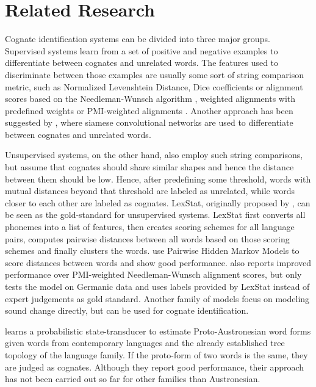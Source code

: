 \documentclass[6pt]{article}
\begin{document}
\section{Related Research}
\label{Related_Research}
Cognate identification systems can be divided into three major groups. Supervised systems learn from a set of positive and negative examples to differentiate between cognates and unrelated words. The features used to discriminate between those examples are usually some sort of  string comparison metric, such as Normalized Levenshtein Distance, Dice coefficients or  alignment scores based on the Needleman-Wunsch algorithm  \citep{bergsma2007alignment,inkpen2005automatic}, weighted alignments with predefined weights \citep{kondrak2000new} or PMI-weighted alignments \citep{jager2014phylogenetic}. Another approach has been suggested by \cite{rama2016siamese}, where siamese convolutional networks are used to differentiate between cognates and unrelated words. 

Unsupervised systems, on the other hand, also employ such string comparisons, but assume that cognates should share similar shapes and hence the distance between them should be low. Hence, after predefining some threshold, words with mutual distances beyond that threshold are labeled as unrelated, while words closer to each other are labeled as cognates.  LexStat, originally proposed by \cite{list2012lexstat}, can be seen as the gold-standard for unsupervised systems. LexStat first converts all phonemes into a list of features, then creates scoring schemes for all language pairs, computes pairwise distances between all words based on those scoring schemes and finally clusters the words. \cite{mackay2005computing,wahle2013alignment} use Pairwise Hidden Markov Models to score distances between words and show good performance.  \cite{wahle2013alignment} also reports improved performance over PMI-weighted Needleman-Wunsch alignment scores, but only tests the model on Germanic data and uses labels provided by LexStat instead of expert judgements as gold standard. Another family of models focus on modeling sound change directly, but can be used for cognate identification. 

\cite{bouchard2013automated} learns a probabilistic state-transducer to estimate Proto-Austronesian word forms given words from contemporary languages and the already established tree topology of the language family. If the proto-form of two words is the same, they are judged as cognates. Although they report good performance, their approach has not been carried out so far for other families than Austronesian.
\end{document}

